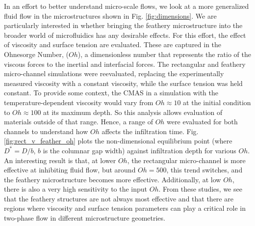 \documentclass[%
 aip,
 amsmath,amssymb,
 reprint,%
]{revtex4-1}
\begin{document}
In an effort to better understand micro-scale flows, we look at a more generalized fluid flow in the microstructures shown in Fig. \ref{fig:dimensions}. We are particularly interested in whether bringing the feathery microstructure into the broader world of microfluidics has any desirable effects. For this effort, the effect of viscosity and surface tension are evaluated. These are captured in the Ohnesorge Number, ($Oh$), a dimensionless number that represents the ratio of the viscous forces to the inertial and interfacial forces. 
The rectangular and feathery micro-channel simulations were reevaluated, replacing the experimentally measured viscosity with a constant viscosity, while the surface tension was held constant.
To provide some context, the CMAS in a simulation with the temperature-dependent viscosity would vary from 
$Oh\approx 10$ at the initial condition to $Oh \approx 100$ at its maximum depth. So this analysis allows evaluation of materials outside of that range.
Hence, a range of $Oh$ were evaluated for both channels to understand how $Oh$ affects the infiltration time. 
Fig. \ref{fig:rect_v_feather_oh} plots the non-dimensional equilibrium point (where $D^{*} = D/b$, $b$ is the columnar gap width) against infiltration depth for various $Oh$. 
An interesting result is that, at lower $Oh$, the rectangular micro-channel is more effective at inhibiting fluid flow, but around $Oh=500$, this trend switches, and the feathery microstructure becomes more effective. Additionally, at low $Oh$, there is also a very high sensitivity to the input $Oh$.  
From these studies, we see that the feathery structures are not always most effective and that there are regions where viscosity and surface tension parameters can play a critical role in two-phase flow in different microstructure geometries. 
\end{document}
